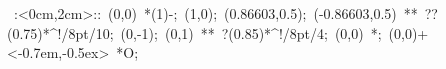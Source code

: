 %


\hbox{
\xy    <2cm,0cm>:<0cm,2cm>::
       (0,0) *\ellipse(1){-}; (1,0);
       (0.86603,0.5); (-0.86603,0.5) **\dir{-} ??(0.75)*^!/8pt/{10}; 
       (0,-1); (0,1) **\dir{-} ?(0.85)*^!/8pt/{4}; 
       (0,0) *{\bullet}; (0,0)+<-0.7em,-0.5ex> *{O};
\endxy}



